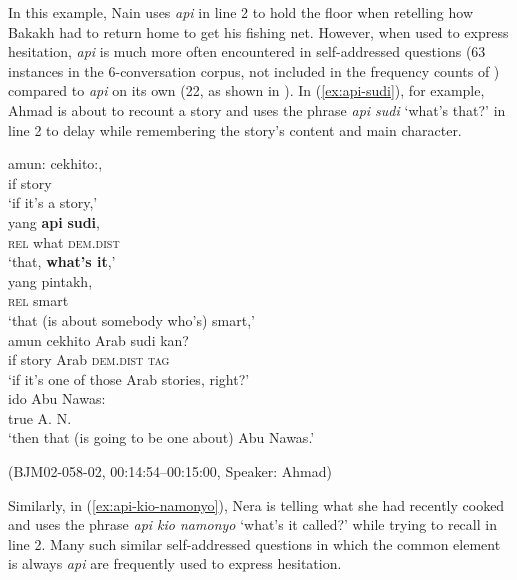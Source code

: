\documentclass[output=paper,colorlinks,citecolor=brown
\ChapterDOI{10.5281/zenodo.15697585}
]{langscibook}
\begin{document}
In this example, Nain uses \textit{api} in line 2 to hold the floor when retelling how Bakakh had to return home to get his fishing net. However, when used to express hesitation, \textit{api} is much more often encountered in self-addressed questions (63 instances in the 6-conversation corpus, not included in the frequency counts of ) compared to \textit{api} on its own (22, as shown in ). In (\ref{ex:api-sudi}), for example, Ahmad is about to recount a story and uses the phrase \textit{api sudi} `what's that?' in line 2 to delay while remembering the story's content and main character.

\begin{exe}
    \ex\label{ex:api-sudi} \begin{xlist}[0\quad →A:]
         \gll
        amun: cekhito:, \\
        if story \\
        \glt `if it's a story,' \\
         \gll
        yang \textbf{api} \textbf{sudi}, \\
        \textsc{rel} what \textsc{dem.dist} \\
        \glt `that, \textbf{what's it},' \\
        \exi{3\quad \hphantom{→A:}} \gll
        yang pintakh, \\
        \textsc{rel} smart \\
        \glt `that (is about somebody who's) smart,' \\
        \exi{4\quad \hphantom{→A:}} \gll
        amun cekhito Arab sudi kan? \\
        if story Arab \textsc{dem.dist} \textsc{tag} \\
        \glt `if it's one of those Arab stories, right?' \\
        \exi{5\quad \hphantom{→A:}} \gll
        ido Abu Nawas: \\
        true A. N. \\
        \glt `then that (is going to be one about) Abu Nawas.' \\
    \end{xlist}
    \hfill (BJM02-058-02, 00:14:54–00:15:00, Speaker: Ahmad) 
\end{exe}

Similarly, in (\ref{ex:api-kio-namonyo}), Nera is telling what she had recently cooked and uses the phrase \textit{api kio namonyo} `what's it called?' while trying to recall in line 2. Many such similar self-addressed questions in which the common element is always \textit{api} are frequently used to express hesitation.
\end{document}
